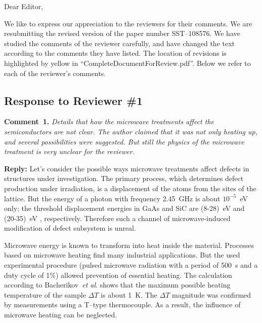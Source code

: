 \documentclass[10pt]{iopart}
\begin{document}
Dear Editor,

We like to express our appreciation to the reviewers for their comments.
We are resubmitting the revised version of the paper number SST--108576.
We have studied the comments of the reviewer carefully, and have changed the text according to the comments they
have listed.
The location of revisions is  highlighted by yellow in ``CompleteDocumentForReview.pdf''.
Below we refer to each of the reviewer’s comments.



\subsection*{Response to Reviewer \#1 }

\noindent
\textcolor[rgb]{0.00,0.50,1.00}{\textbf{Comment~1.}}
\emph{Details that how the microwave treatments affect the semiconductors are not clear.
The author claimed that it was not only heating up, and several possibilities were suggested.
But still the physics of the microwave treatment is very unclear for the reviewer.}

\noindent
\textcolor[rgb]{0.51,0.00,0.00}{\textbf{Reply:}}
Let's consider the possible ways microwave treatments affect defects in structures under investigation.
The primary process, which determines defect production under irradiation,
is a displacement of the atoms from the sites of the lattice.
But the energy of a photon with frequency 2.45~GHz is about $10^{-5}$~eV only;
the threshold displacement energies in GaAs and SiC are (8-28)~eV \cite{Ed:GaAs} and (20-35)~eV \cite{Ed:SiC}, respectively.
Therefore such a channel of microwave-induced modification of defect subsystem is unreal.

Microwave energy is known to transform into heat inside the material.
Processes based on microwave heating find many industrial applications.
But the used experimental procedure
(pulsed microwave radiation with a period of 500~s and a duty cycle of 1\%)
allowed prevention of essential heating.
The calculation according to Bacherikov~\emph{et al}. \cite{Bacherikov2008En} shows that
the maximum possible heating temperature of the sample $\Delta T$ is about 1~K.
The $\Delta T$ magnitude was confirmed by measurements using a T--type thermocouple.
As a result, the influence of microwave heating can be neglected.
\end{document}
